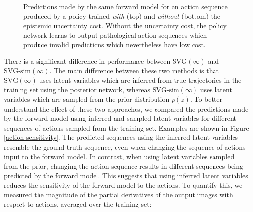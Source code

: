 \documentclass{article} %
\begin{document}
\begin{figure}[t!]
    \centering
     \\

    \caption{Predictions made by the same forward model for an action sequence produced by a policy trained \textit{with} (top) and \textit{without} (bottom) the epistemic uncertainty cost. Without the uncertainty cost, the policy network learns to output pathological action sequences which produce invalid predictions which nevertheless have low cost.}
    \label{svg-pred}
\end{figure}

There is a significant difference in performance between $\mbox{SVG}(\infty)$ and $\mbox{SVG-sim}(\infty)$.
The main difference between these two methods is that $\mbox{SVG}(\infty)$ uses latent variables which are inferred from true trajectories in the training set using the posterior network, whereas $\mbox{SVG-sim}(\infty)$ uses latent variables which are sampled from the prior distribution $p(z)$. To better understand the effect of these two approaches, we compared the predictions made by the forward model using inferred and sampled latent variables for different sequences of actions sampled from the training set. Examples are shown in Figure \ref{action-sensitivity}. The predicted sequences using the inferred latent variables resemble the ground truth sequence, even when changing the sequence of actions input to the forward model. In contrast, when using latent variables sampled from the prior, changing the action sequence results in different sequences being predicted by the forward model.
This suggests that using inferred latent variables reduces the sensitivity of the forward model to the actions.
To quantify this, we measured the magnitude of the partial derivatives of the output images with respect to actions, averaged over the training set:
\end{document}
